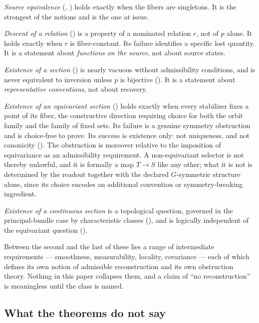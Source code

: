 \documentclass[11pt,reqno]{amsart}
\theoremstyle{plain}
\theoremstyle{definition}
\theoremstyle{remark}
\begin{document}
\emph{Source equivalence} (, ) holds exactly when the fibers are singletons. It is the strongest of the notions and is the one at issue.

\emph{Descent of a relation} () is a property of a nominated relation $r$, not of $p$ alone. It holds exactly when $r$ is fiber-constant. Its failure identifies a specific lost quantity. It is a statement about \emph{functions on the source}, not about source states.

\emph{Existence of a section} () is nearly vacuous without admissibility conditions, and is never equivalent to inversion unless $p$ is bijective (). It is a statement about \emph{representative conventions}, not about recovery.

\emph{Existence of an equivariant section} () holds exactly when every stabilizer fixes a point of its fiber, the constructive direction requiring choice for both the orbit family and the family of fixed sets. Its failure is a genuine symmetry obstruction and is choice-free to prove. Its success is existence only: not uniqueness, and not canonicity (). The obstruction is moreover relative to the imposition of equivariance as an admissibility requirement. A non-equivariant selector is not thereby unlawful, and it is formally a map $T\to S$ like any other; what it is not is determined by the readout together with the declared $G$-symmetric structure alone, since its choice encodes an additional convention or symmetry-breaking ingredient.

\emph{Existence of a continuous section} is a topological question, governed in the principal-bundle case by characteristic classes (), and is logically independent of the equivariant question ().

Between the second and the last of these lies a range of intermediate requirements --- smoothness, measurability, locality, covariance --- each of which defines its own notion of admissible reconstruction and its own obstruction theory. Nothing in this paper collapses them, and a claim of ``no reconstruction'' is meaningless until the class is named.

\subsection{What the theorems do not say}
\end{document}

